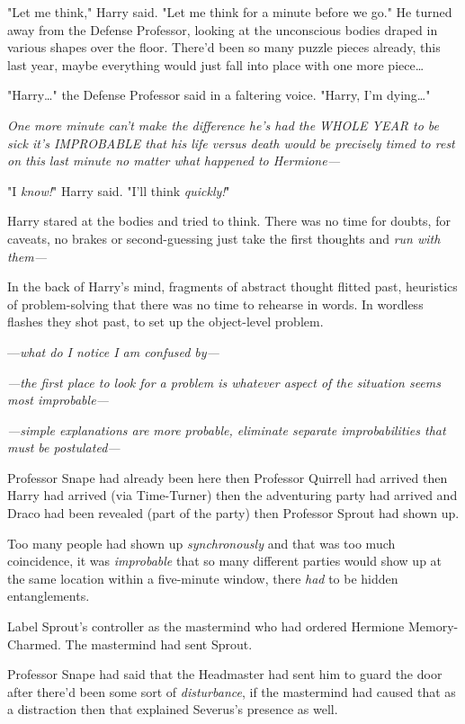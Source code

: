 "Let me think," Harry said. "Let me think for a minute before we go." He turned 
away from the Defense Professor, looking at the unconscious bodies draped in 
various shapes over the floor. There'd been so many puzzle pieces already, this 
last year, maybe everything would just fall into place with one more 
piece{\ldots}

"Harry{\ldots}" the Defense Professor said in a faltering voice. "Harry, I'm 
dying{\ldots}"

\emph{One more minute can't make the difference he's had the WHOLE YEAR to be 
sick it's IMPROBABLE that his life versus death would be precisely timed to 
rest on this last minute no matter what happened to Hermione---}

"I \emph{know!}" Harry said. "I'll think \emph{quickly!}"

Harry stared at the bodies and tried to think. There was no time for doubts, 
for caveats, no brakes or second-guessing just take the first thoughts and 
\emph{run with them---}

In the back of Harry's mind, fragments of abstract thought flitted past, 
heuristics of problem-solving that there was no time to rehearse in words. In 
wordless flashes they shot past, to set up the object-level problem.

---\emph{what do I notice I am confused by---}

\emph{---the first place to look for a problem is whatever aspect of the 
situation seems most improbable---}

\emph{---simple explanations are more probable, eliminate separate 
improbabilities that must be postulated---}

Professor Snape had already been here then Professor Quirrell had arrived then 
Harry had arrived (via Time-Turner) then the adventuring party had arrived and 
Draco had been revealed (part of the party) then Professor Sprout had shown up.

Too many people had shown up \emph{synchronously} and that was too much 
coincidence, it was \emph{improbable} that so many different parties would show 
up at the same location within a five-minute window, there \emph{had} to be 
hidden entanglements.

Label Sprout's controller as the mastermind who had ordered Hermione 
Memory-Charmed. The mastermind had sent Sprout.

Professor Snape had said that the Headmaster had sent him to guard the door 
after there'd been some sort of \emph{disturbance}, if the mastermind had 
caused that as a distraction then that explained Severus's presence as well.

